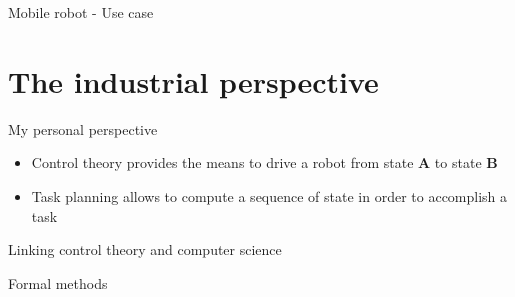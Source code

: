 \documentclass[usenames,dvipsnames,xcolor=table]{beamer}
\begin{document}
\begin{frame}{Mobile robot - Use case}
    \begin{center}
    \end{center}
\end{frame}


	


\section{The industrial perspective}


\begin{frame}{My personal perspective}

\begin{itemize}
    \item Control theory provides the means to drive a robot from state \textbf{A} to state \textbf{B}
    \item Task planning allows to compute a sequence of state in order to accomplish a task
\end{itemize}

\end{frame}

\begin{frame}{Linking control theory and computer science}

Formal methods 

\end{frame}
\end{document}

